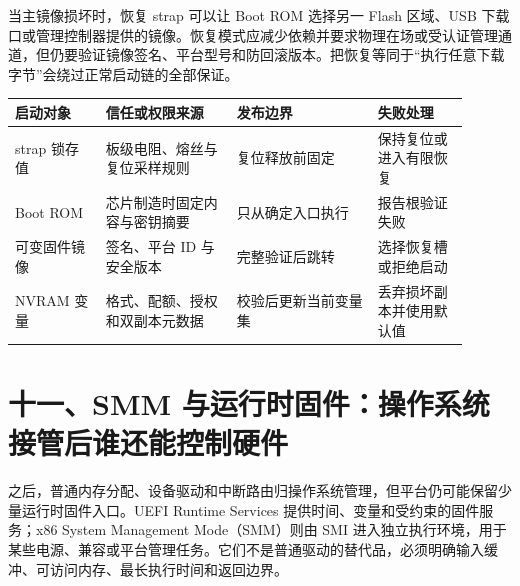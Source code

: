 
当主镜像损坏时，恢复 strap 可以让 Boot ROM 选择另一 Flash 区域、USB 下载口或管理控制器提供的镜像。恢复模式应减少依赖并要求物理在场或受认证管理通道，但仍要验证镜像签名、平台型号和防回滚版本。把恢复等同于“执行任意下载字节”会绕过正常启动链的全部保证。

\begin{longtable}{L{0.18\linewidth}L{0.26\linewidth}L{0.28\linewidth}L{0.18\linewidth}}
\toprule
启动对象 & 信任或权限来源 & 发布边界 & 失败处理 \\
\midrule
strap 锁存值 & 板级电阻、熔丝与复位采样规则 & 复位释放前固定 & 保持复位或进入有限恢复 \\\tablerowrule
Boot ROM & 芯片制造时固定内容与密钥摘要 & 只从确定入口执行 & 报告根验证失败 \\\tablerowrule
可变固件镜像 & 签名、平台 ID 与安全版本 & 完整验证后跳转 & 选择恢复槽或拒绝启动 \\\tablerowrule
NVRAM 变量 & 格式、配额、授权和双副本元数据 & 校验后更新当前变量集 & 丢弃损坏副本并使用默认值 \\
\bottomrule
\end{longtable}

\section{十一、SMM 与运行时固件：操作系统接管后谁还能控制硬件}

 之后，普通内存分配、设备驱动和中断路由归操作系统管理，但平台仍可能保留少量运行时固件入口。UEFI Runtime Services 提供时间、变量和受约束的固件服务；x86 System Management Mode（SMM）则由 SMI 进入独立执行环境，用于某些电源、兼容或平台管理任务。它们不是普通驱动的替代品，必须明确输入缓冲、可访问内存、最长执行时间和返回边界。


